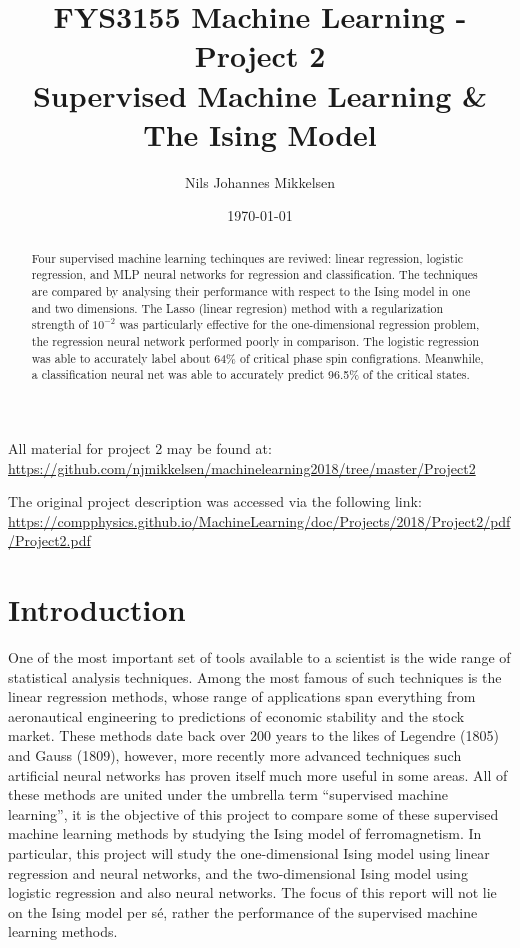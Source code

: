 \documentclass[nofootinbib,reprint,english]{revtex4-1}
\begin{document}
\title{FYS3155 Machine Learning - Project 2\\Supervised Machine Learning \& The Ising Model}
\author{Nils Johannes Mikkelsen}
\date{\today}
\noaffiliation
\begin{abstract}
Four supervised machine learning techinques are reviwed: linear regression, logistic regression, and MLP neural networks for regression and classification. The techniques are compared by analysing their performance with respect to the Ising model in one and two dimensions. The Lasso (linear regresion) method with a regularization strength of \(10^{-2}\) was particularly effective for the one-dimensional regression problem, the regression neural network performed poorly in comparison. The logistic regression was able to accurately label about 64\% of critical phase spin configrations. Meanwhile, a classification neural net was able to accurately predict 96.5\% of the critical states.
\end{abstract}
\maketitle

All material for project 2 may be found at:\\
{\scriptsize\url{https://github.com/njmikkelsen/machinelearning2018/tree/master/Project2}}

The original project description was accessed via the following link: \cite{project}\\
{\scriptsize\url{https://compphysics.github.io/MachineLearning/doc/Projects/2018/Project2/pdf/Project2.pdf}}

\section{Introduction}
One of the most important set of tools available to a scientist is the wide range of statistical analysis techniques. Among the most famous of such techniques is the linear regression methods, whose range of applications span everything from aeronautical engineering to predictions of economic stability and the stock market. These methods date back over 200 years to the likes of Legendre (1805) and Gauss (1809), however, more recently more advanced techniques such artificial neural networks has proven itself much more useful in some areas. All of these methods are united under the umbrella term ``supervised machine learning'', it is the objective of this project to compare some of these supervised machine learning methods by studying the Ising model of ferromagnetism. In particular, this project will study the one-dimensional Ising model using linear regression and neural networks, and the two-dimensional Ising model using logistic regression and also neural networks. The focus of this report will not lie on the Ising model per sé, rather the performance of the supervised machine learning methods.
\end{document}
